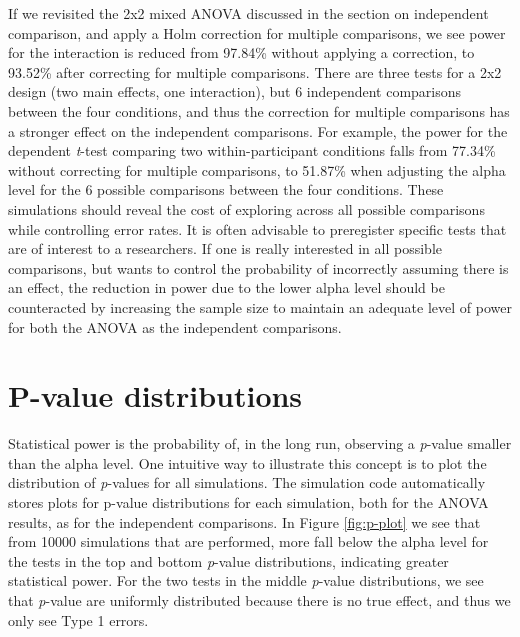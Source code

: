 \documentclass[,jou, draftfirst, a4paper,floatsintext]{apa6}
\begin{document}
If we revisited the 2x2 mixed ANOVA discussed in the section on independent comparison, and apply a Holm correction for multiple comparisons, we see power for the interaction is reduced from 97.84\% without applying a correction, to 93.52\% after correcting for multiple comparisons.
There are three tests for a 2x2 design (two main effects, one interaction), but 6 independent comparisons between the four conditions, and thus the correction for multiple comparisons has a stronger effect on the independent comparisons.
For example, the power for the dependent \emph{t}-test comparing two within-participant conditions falls from 77.34\% without correcting for multiple comparisons, to 51.87\% when adjusting the alpha level for the 6 possible comparisons between the four conditions.
These simulations should reveal the cost of exploring across all possible comparisons while controlling error rates.
It is often advisable to preregister specific tests that are of interest to a researchers.
If one is really interested in all possible comparisons, but wants to control the probability of incorrectly assuming there is an effect, the reduction in power due to the lower alpha level should be counteracted by increasing the sample size to maintain an adequate level of power for both the ANOVA as the independent comparisons.

\hypertarget{p-value-distributions}{%
\section{P-value distributions}\label{p-value-distributions}}

Statistical power is the probability of, in the long run, observing a \emph{p}-value smaller than the alpha level.
One intuitive way to illustrate this concept is to plot the distribution of \emph{p}-values for all simulations.
The simulation code automatically stores plots for p-value distributions for each simulation, both for the ANOVA results, as for the independent comparisons.
In Figure \ref{fig:p-plot} we see that from 10000 simulations that are performed, more fall below the alpha level for the tests in the top and bottom \emph{p}-value distributions, indicating greater statistical power.
For the two tests in the middle \emph{p}-value distributions, we see that \emph{p}-value are uniformly distributed because there is no true effect, and thus we only see Type 1 errors.
\end{document}

